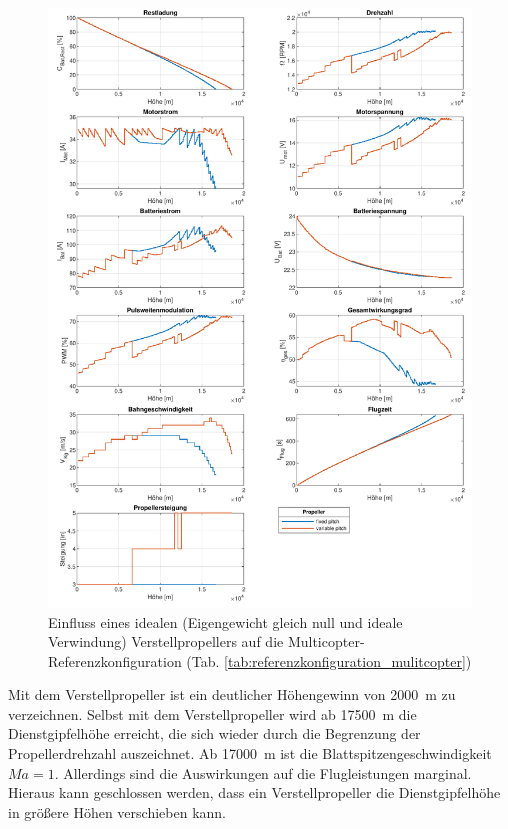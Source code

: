\begin{figure}[H]
\centering
	\includegraphics[scale=0.7]{Diagramme/Verstellpropeller.pdf}
	\caption{Einfluss eines idealen (Eigengewicht gleich null und ideale Verwindung) Verstellpropellers auf die Multicopter-Referenzkonfiguration (Tab. \ref{tab:referenzkonfiguration_mulitcopter})}
	\label{abb:verstellpropeller}
\end{figure}
Mit dem Verstellpropeller ist ein deutlicher Höhengewinn von \SI{2000}{m} zu verzeichnen. Selbst mit dem Verstellpropeller wird ab \SI{17500}{m} die Dienstgipfelhöhe erreicht, die sich wieder durch die Begrenzung der Propellerdrehzahl auszeichnet. Ab \SI{17000}{m} ist die Blattspitzengeschwindigkeit  \ensuremath{Ma = 1}. Allerdings sind die Auswirkungen auf die Flugleistungen marginal. Hieraus kann geschlossen werden, dass ein Verstellpropeller die Dienstgipfelhöhe in größere Höhen verschieben kann. \\
